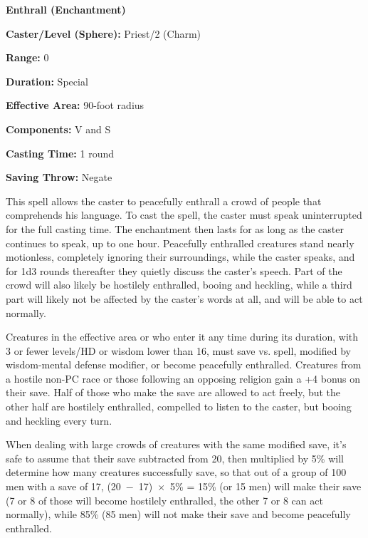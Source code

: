 \begin{multicols}{2}
\vspace{1em}

\noindent
\begin{minipage}{\columnwidth}

\noindent \textbf{Enthrall (Enchantment)}

\noindent \textbf{Caster/Level (Sphere):} Priest/2 (Charm)

\noindent \textbf{Range:} 0

\noindent \textbf{Duration:} Special

\noindent \textbf{Effective Area:} 90-foot radius

\noindent \textbf{Components:} V and S

\noindent \textbf{Casting Time:} 1 round

\noindent \textbf{Saving Throw:} Negate

\end{minipage}

This spell allows the caster to peacefully enthrall a crowd of people that comprehends his language.  To cast the spell, the caster must speak uninterrupted for the full casting time.  The enchantment then lasts for as long as the caster continues to speak, up to one hour.  Peacefully enthralled creatures stand nearly motionless, completely ignoring their surroundings, while the caster speaks, and for 1d3 rounds thereafter they quietly discuss the caster's speech.  Part of the crowd will also likely be hostilely enthralled, booing and heckling, while a third part will likely not be affected by the caster's words at all, and will be able to act normally.

Creatures in the effective area or who enter it any time during its duration, with 3 or fewer levels/HD or wisdom lower than 16, must save vs. spell, modified by wisdom-mental defense modifier, or become peacefully enthralled.  Creatures from a hostile non-PC race or those following an opposing religion gain a +4 bonus on their save.  Half of those who make the save are allowed to act freely, but the other half are hostilely enthralled, compelled to listen to the caster, but booing and heckling every turn.  

When dealing with large crowds of creatures with the same modified save, it's safe to assume that their save subtracted from 20, then multiplied by 5\% will determine how many creatures successfully save, so that out of a group of 100 men with a save of 17, (20~$-$~17)~$\times$~5\% = 15\% (or 15 men) will make their save (7 or 8 of those will become hostilely enthralled, the other 7 or 8 can act normally), while 85\% (85 men) will not make their save and become peacefully enthralled.  


\end{multicols}
